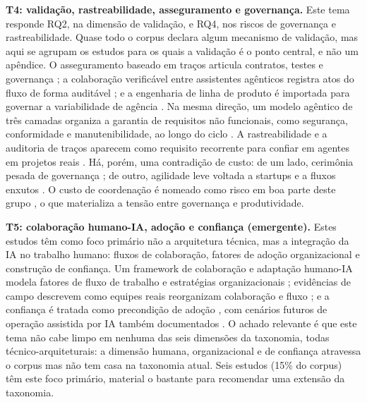 \noindent\textbf{T4: validação, rastreabilidade, asseguramento e governança.} Este tema responde RQ2, na dimensão de validação, e RQ4, nos riscos de governança e rastreabilidade. Quase todo o corpus declara algum mecanismo de validação, mas aqui se agrupam os estudos para os quais a validação é o ponto central, e não um apêndice. O asseguramento baseado em traços articula contratos, testes e governança \cite{Paduraru2026}; a colaboração verificável entre assistentes agênticos registra atos do fluxo de forma auditável \cite{Merchant2025}; e a engenharia de linha de produto é importada para governar a variabilidade de agência \cite{Alsegier2026}. Na mesma direção, um modelo agêntico de três camadas organiza a garantia de requisitos não funcionais, como segurança, conformidade e manutenibilidade, ao longo do ciclo \cite{Zabardast2025}. A rastreabilidade e a auditoria de traços aparecem como requisito recorrente para confiar em agentes em projetos reais \cite{Paduraru2026,Merchant2025,Macedo2026,SKaruppuchamy2026,Watfa2026,Chechik2026,Anon2026}. Há, porém, uma contradição de custo: de um lado, cerimônia pesada de governança \cite{Merchant2025,Paduraru2026}; de outro, agilidade leve voltada a startups e a fluxos enxutos \cite{Khan2026,RanjanSapkota2025,JulesWhite2023}. O custo de coordenação é nomeado como risco em boa parte deste grupo \cite{MitulModi2024,Ulfsnes2024,Akbar2025,Baron2025,KRRaghi2024,Gupta2022,KumarAle2024}, o que materializa a tensão entre governança e produtividade.

\noindent\textbf{T5: colaboração humano-IA, adoção e confiança (emergente).} Estes estudos têm como foco primário não a arquitetura técnica, mas a integração da IA no trabalho humano: fluxos de colaboração, fatores de adoção organizacional e construção de confiança. Um framework de colaboração e adaptação humano-IA modela fatores de fluxo de trabalho e estratégias organizacionais \cite{DanielRusso2024}; evidências de campo descrevem como equipes reais reorganizam colaboração e fluxo \cite{Ulfsnes2024,Akbar2025}; e a confiança é tratada como precondição de adoção \cite{Baron2025}, com cenários futuros de operação assistida por IA também documentados \cite{JSauvola2024}. O achado relevante é que este tema não cabe limpo em nenhuma das seis dimensões da taxonomia, todas técnico-arquiteturais: a dimensão humana, organizacional e de confiança atravessa o corpus mas não tem casa na taxonomia atual. Seis estudos (15\% do corpus) têm este foco primário, material o bastante para recomendar uma extensão da taxonomia.

